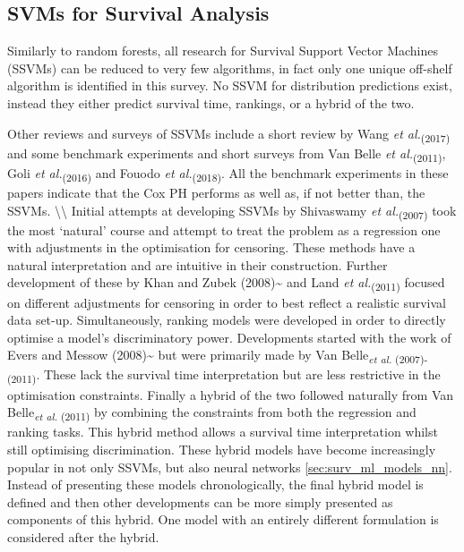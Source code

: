 \documentclass[
  letterpaper,
]{scrbook}
\theoremstyle{plain}
\theoremstyle{definition}
\theoremstyle{remark}
\begin{document}
\subsection{SVMs for Survival Analysis}
\label{sec:surv_ml_models_svm_surv}

Similarly to random forests, all research for Survival Support Vector
Machines (SSVMs) can be reduced to very few algorithms, in fact only one
unique off-shelf algorithm is identified in this survey. No SSVM for
distribution predictions exist, instead they either predict survival
time, rankings, or a hybrid of the two.

Other reviews and surveys of SSVMs include a short review by Wang
\textit{et al.}\textsubscript{(2017)}\cite{Wang2017} and some benchmark
experiments and short surveys from Van Belle
\textit{et al.}\textsubscript{(2011)}\cite{VanBelle2011b}, Goli
\textit{et al.}\textsubscript{(2016)}\cite{Goli2016a} and Fouodo
\textit{et al.}\textsubscript{(2018)}\cite{pkgsurvivalsvm}. All the
benchmark experiments in these papers indicate that the Cox PH performs
as well as, if not better than, the SSVMs.
\textbackslash\textbackslash{} Initial attempts at developing SSVMs by
Shivaswamy \textit{et al.}\textsubscript{(2007)}\cite{Shivaswamy2007}
took the most `natural' course and attempt to treat the problem as a
regression one with adjustments in the optimisation for censoring. These
methods have a natural interpretation and are intuitive in their
construction. Further development of these by Khan and Zubek
(2008)\textasciitilde{}\cite{Khan2008} and Land
\textit{et al.}\textsubscript{(2011)}\cite{Land2011} focused on
different adjustments for censoring in order to best reflect a realistic
survival data set-up. Simultaneously, ranking models were developed in
order to directly optimise a model's discriminatory power. Developments
started with the work of Evers and Messow
(2008)\textasciitilde{}\cite{Evers2008} but were primarily made by Van
Belle\textsubscript{\textit{et al.} (2007)-(2011)}\cite{VanBelle2010, VanBelle2007, VanBelle2008, VanBelle2011a}.
These lack the survival time interpretation but are less restrictive in
the optimisation constraints. Finally a hybrid of the two followed
naturally from Van
Belle\textsubscript{\textit{et al.} (2011)}\cite{VanBelle2011b} by
combining the constraints from both the regression and ranking tasks.
This hybrid method allows a survival time interpretation whilst still
optimising discrimination. These hybrid models have become increasingly
popular in not only SSVMs, but also neural networks
\ref{sec:surv_ml_models_nn}. Instead of presenting these models
chronologically, the final hybrid model is defined and then other
developments can be more simply presented as components of this hybrid.
One model with an entirely different formulation is considered after the
hybrid.
\end{document}
